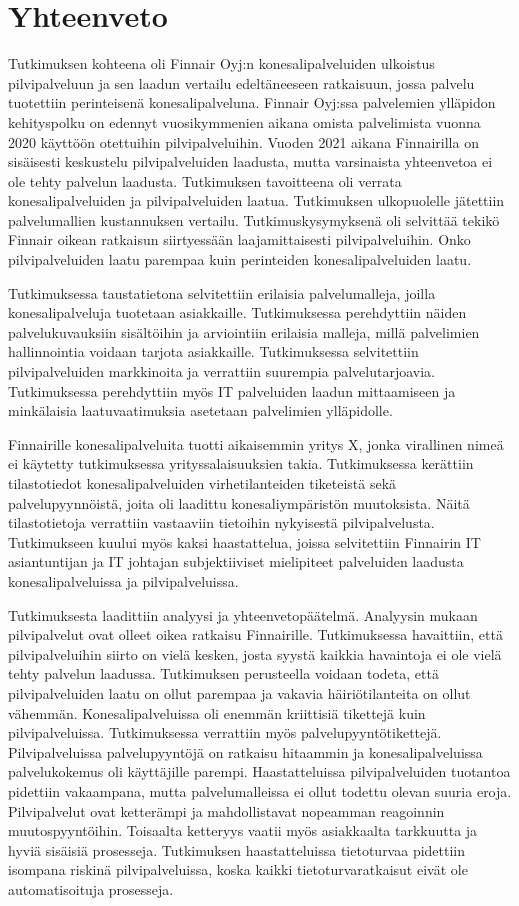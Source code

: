 \chapter{Yhteenveto\label{conclusions}}
Tutkimuksen kohteena oli Finnair Oyj:n konesalipalveluiden ulkoistus pilvipalveluun ja sen laadun vertailu edeltäneeseen ratkaisuun, jossa palvelu tuotettiin perinteisenä konesalipalveluna. Finnair Oyj:ssa palvelemien ylläpidon kehityspolku on edennyt vuosikymmenien aikana omista palvelimista vuonna 2020 käyttöön otettuihin pilvipalveluihin. Vuoden 2021 aikana Finnairilla on sisäisesti keskustelu pilvipalveluiden laadusta, mutta varsinaista yhteenvetoa ei ole tehty palvelun laadusta. Tutkimuksen tavoitteena oli verrata konesalipalveluiden ja pilvipalveluiden laatua. Tutkimuksen ulkopuolelle jätettiin palvelumallien kustannuksen vertailu. Tutkimuskysymyksenä oli selvittää tekikö Finnair oikean ratkaisun siirtyessään laajamittaisesti pilvipalveluihin. Onko pilvipalveluiden laatu parempaa kuin perinteiden konesalipalveluiden laatu.

Tutkimuksessa taustatietona selvitettiin erilaisia palvelumalleja, joilla konesalipalveluja tuotetaan asiakkaille. Tutkimuksessa perehdyttiin näiden palvelukuvauksiin sisältöihin ja arviointiin erilaisia malleja, millä palvelimien hallinnointia voidaan tarjota asiakkaille. Tutkimuksessa selvitettiin pilvipalveluiden markkinoita ja verrattiin suurempia palvelutarjoavia. Tutkimuksessa perehdyttiin myös IT palveluiden laadun mittaamiseen ja minkälaisia laatuvaatimuksia asetetaan palvelimien ylläpidolle.

Finnairille konesalipalveluita tuotti aikaisemmin yritys X, jonka virallinen nimeä ei käytetty tutkimuksessa yrityssalaisuuksien takia. Tutkimuksessa kerättiin tilastotiedot konesalipalveluiden virhetilanteiden tiketeistä sekä palvelupyynnöistä, joita oli laadittu konesaliympäristön muutoksista. Näitä tilastotietoja verrattiin vastaaviin tietoihin nykyisestä pilvipalvelusta. Tutkimukseen kuului myös kaksi haastattelua, joissa selvitettiin Finnairin IT asiantuntijan ja IT johtajan subjektiiviset mielipiteet palveluiden laadusta konesalipalveluissa ja pilvipalveluissa.

Tutkimuksesta laadittiin analyysi ja yhteenvetopäätelmä. Analyysin mukaan pilvipalvelut ovat olleet oikea ratkaisu Finnairille. Tutkimuksessa havaittiin, että pilvipalveluihin siirto on vielä kesken, josta syystä kaikkia havaintoja ei ole vielä tehty palvelun laadussa. Tutkimuksen perusteella voidaan todeta, että pilvipalveluiden laatu on ollut parempaa ja vakavia häiriötilanteita on ollut vähemmän. Konesalipalveluissa oli enemmän kriittisiä tikettejä kuin pilvipalveluissa. Tutkimuksessa verrattiin myös palvelupyyntötikettejä. Pilvipalveluissa palvelupyyntöjä on ratkaisu hitaammin ja konesalipalveluissa palvelukokemus oli käyttäjille parempi. Haastatteluissa pilvipalveluiden tuotantoa pidettiin vakaampana, mutta palvelumalleissa ei ollut todettu olevan suuria eroja. Pilvipalvelut ovat ketterämpi ja mahdollistavat nopeamman reagoinnin muutospyyntöihin. Toisaalta ketteryys vaatii myös asiakkaalta tarkkuutta ja hyviä sisäisiä prosesseja. Tutkimuksen haastatteluissa tietoturvaa pidettiin isompana riskinä pilvipalveluissa, koska kaikki tietoturvaratkaisut eivät ole automatisoituja prosesseja.

